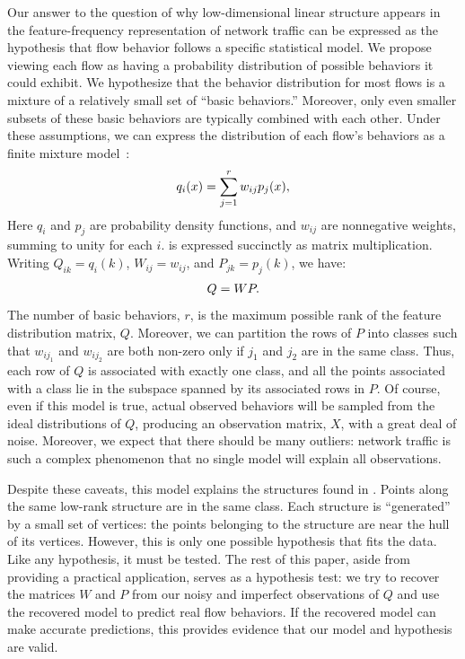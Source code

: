 \documentclass{acm_proc_article-sp}
\begin{document}
Our answer to the question of why low-dimensional linear structure appears in the feature-frequency representation of network traffic can be expressed as the hypothesis that flow behavior follows a specific statistical model.
We propose viewing each flow as having a probability distribution of possible behaviors it could exhibit.
We hypothesize that the behavior distribution for most flows is a mixture of a relatively small set of ``basic behaviors.''
Moreover, only even smaller subsets of these basic behaviors are typically combined with each other.
Under these assumptions, we can express the distribution of each flow's behaviors as a finite mixture model~\cite{McLachlan00}:
\begin{align}\eqn{mixture-model}
  q_i(x) = \sum_{j=1}^r w_{ij} p_j(x),
\end{align}
Here $q_i$ and $p_j$ are probability density functions, and $w_{ij}$ are nonnegative weights, summing to unity for each $i$.
 is expressed succinctly as matrix multiplication.
Writing $Q_{ik} = q_i(k)$, $W_{ij} = w_{ij}$, and $P_{jk} = p_j(k)$, we have:
\begin{align}\eqn{mixture-model-matrix}
  Q = WP.
\end{align}
The number of basic behaviors, $r$, is the maximum possible rank of the feature distribution matrix, $Q$.
Moreover, we can partition the rows of $P$ into classes such that $w_{ij_1}$ and $w_{ij_2}$ are both non-zero only if $j_1$ and $j_2$ are in the same class.
Thus, each row of $Q$ is associated with exactly one class, and all the points associated with a class lie in the subspace spanned by its associated rows in $P$.
Of course, even if this model is true, actual observed behaviors will be sampled from the ideal distributions of $Q$, producing an observation matrix, $X$, with a great deal of noise.
Moreover, we expect that there should be many outliers:
network traffic is such a complex phenomenon that no single model will explain all observations.

Despite these caveats, this model explains the structures found in .
Points along the same low-rank structure are in the same class.
Each structure is ``generated'' by a small set of vertices:
the points belonging to the structure are near the hull of its vertices.
However, this is only one possible hypothesis that fits the data.
Like any hypothesis, it must be tested.
The rest of this paper, aside from providing a practical application, serves as a hypothesis test:
we try to recover the matrices $W$ and $P$ from our noisy and imperfect observations of $Q$ and use the recovered model to predict real flow behaviors.
If the recovered model can make accurate predictions, this provides evidence that our model and hypothesis are valid.
\end{document}
